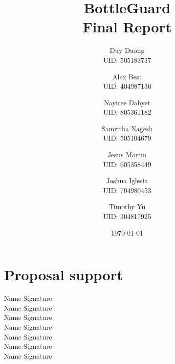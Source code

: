 \documentclass[12pt]{article}
\begin{document}
	\title{BottleGuard\\Final Report}
	\author{Duy Duong\\UID: 505183737 \and Alex Best\\UID: 404987130 \and Nayiree Dahyet \\ UID: 805361182 \and Samritha Nagesh \\UID: 505104679\and Jesus Martin \\UID: 605358449 \and Joshua Iglesia\\UID: 704980453 \and Timothy Yu\\UID: 304817925}
	\date{\today}
	\maketitle

	
	\section*{Proposal support}
	\begin{center}
			Name \underline{\hspace{8cm}}
		Signature \underline{\hspace{3cm}}\\ \vspace{5mm}
		Name \underline{\hspace{8cm}}
		Signature \underline{\hspace{3cm}}\\  \vspace{5mm}
		Name \underline{\hspace{8cm}}
		Signature \underline{\hspace{3cm}}\\  \vspace{5mm}
		Name \underline{\hspace{8cm}}
		Signature \underline{\hspace{3cm}}\\  \vspace{5mm}
		Name \underline{\hspace{8cm}}
		Signature \underline{\hspace{3cm}}\\  \vspace{5mm}
		Name \underline{\hspace{8cm}}
		Signature \underline{\hspace{3cm}}\\  \vspace{5mm}
		Name \underline{\hspace{8cm}}
		Signature \underline{\hspace{3cm}}\\  \vspace{5mm}
	\end{center}
\end{document}
